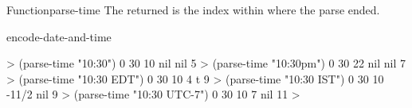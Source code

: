 \documentclass[10pt,twoside,english,pdftex]{article}
\begin{document}
\begin{functiondoc}{Function}{parse-time}{%
    }
The returned  is the index within  where the
parse ended.

\begin{alsos}{encode-date-and-time}
\end{alsos}

\fnexamples
%
\W\supp
\begin{example}
  > (parse-time "10:30")
  0
  30
  10
  nil
  nil
  5\goodpagebreak
  > (parse-time "10:30pm")
  0
  30
  22
  nil
  nil
  7\goodpagebreak
  > (parse-time "10:30 EDT")
  0
  30
  10
  4
  t
  9\goodpagebreak
  > (parse-time "10:30 IST")
  0
  30
  10
 -11/2
  nil
  9\goodpagebreak
  > (parse-time "10:30 UTC-7")
  0
  30
  10
  7
  nil
  11
  >
\end{example}

\end{functiondoc}

\end{document}
